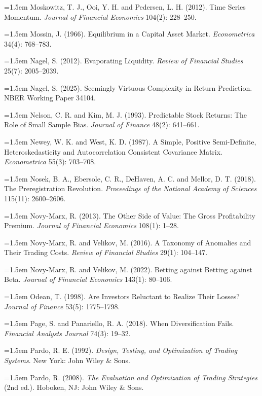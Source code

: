 \hangindent=1.5em Moskowitz, T. J., Ooi, Y. H. and Pedersen, L. H. (2012). Time Series Momentum. \emph{Journal of Financial Economics} 104(2): 228--250.

\hangindent=1.5em Mossin, J. (1966). Equilibrium in a Capital Asset Market. \emph{Econometrica} 34(4): 768--783.

\hangindent=1.5em Nagel, S. (2012). Evaporating Liquidity. \emph{Review of Financial Studies} 25(7): 2005--2039.

\hangindent=1.5em Nagel, S. (2025). Seemingly Virtuous Complexity in Return Prediction. NBER Working Paper 34104.

\hangindent=1.5em Nelson, C. R. and Kim, M. J. (1993). Predictable Stock Returns: The Role of Small Sample Bias. \emph{Journal of Finance} 48(2): 641--661.

\hangindent=1.5em Newey, W. K. and West, K. D. (1987). A Simple, Positive Semi-Definite, Heteroskedasticity and Autocorrelation Consistent Covariance Matrix. \emph{Econometrica} 55(3): 703--708.

\hangindent=1.5em Nosek, B. A., Ebersole, C. R., DeHaven, A. C. and Mellor, D. T. (2018). The Preregistration Revolution. \emph{Proceedings of the National Academy of Sciences} 115(11): 2600--2606.

\hangindent=1.5em Novy-Marx, R. (2013). The Other Side of Value: The Gross Profitability Premium. \emph{Journal of Financial Economics} 108(1): 1--28.

\hangindent=1.5em Novy-Marx, R. and Velikov, M. (2016). A Taxonomy of Anomalies and Their Trading Costs. \emph{Review of Financial Studies} 29(1): 104--147.

\hangindent=1.5em Novy-Marx, R. and Velikov, M. (2022). Betting against Betting against Beta. \emph{Journal of Financial Economics} 143(1): 80--106.

\hangindent=1.5em Odean, T. (1998). Are Investors Reluctant to Realize Their Losses? \emph{Journal of Finance} 53(5): 1775--1798.

\hangindent=1.5em Page, S. and Panariello, R. A. (2018). When Diversification Fails. \emph{Financial Analysts Journal} 74(3): 19--32.

\hangindent=1.5em Pardo, R. E. (1992). \emph{Design, Testing, and Optimization of Trading Systems}. New York: John Wiley \& Sons.

\hangindent=1.5em Pardo, R. (2008). \emph{The Evaluation and Optimization of Trading Strategies} (2nd ed.). Hoboken, NJ: John Wiley \& Sons.

